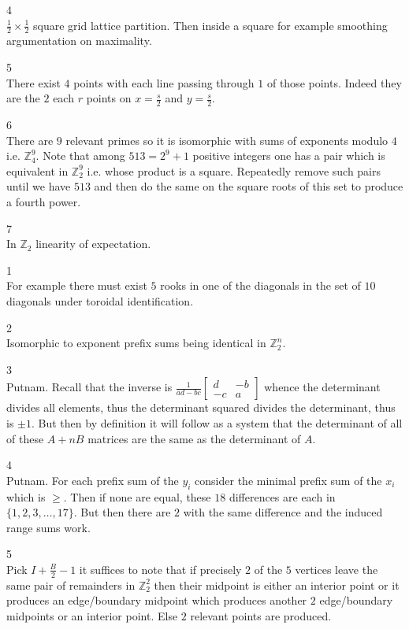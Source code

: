 4 \\
$\frac{1}{2} \times \frac{1}{2}$ square grid lattice partition. Then inside a square for example smoothing argumentation on maximality.

5 \\
There exist $4$ points with each line passing through $1$ of those points. Indeed they are the $2$ each $r$ points on $x=\frac{s}{2}$ and $y=\frac{s}{2}$.

6 \\
There are $9$ relevant primes so it is isomorphic with sums of exponents modulo $4$ i.e. $\mathbb{Z}_4^9$. Note that among $513=2^9+1$ positive integers one has a pair which is equivalent in $\mathbb{Z}_2^9$ i.e. whose product is a square. Repeatedly remove such pairs until we have $513$ and then do the same on the square roots of this set to produce a fourth power.

7 \\
In $\mathbb{Z}_2$ linearity of expectation.

1 \\
For example there must exist $5$ rooks in one of the diagonals in the set of $10$ diagonals under toroidal identification.

2 \\
Isomorphic to exponent prefix sums being identical in $\mathbb{Z}_2^n$.

3 \\
Putnam. Recall that the inverse is $\frac{1}{ad-bc}\begin{bmatrix} d & -b \\ -c & a \end{bmatrix}$ whence the determinant divides all elements, thus the determinant squared divides the determinant, thus is $\pm 1$. But then by definition it will follow as a system that the determinant of all of these $A+nB$ matrices are the same as the determinant of $A$.

4 \\
Putnam. For each prefix sum of the $y_i$ consider the minimal prefix sum of the $x_i$ which is $\ge$. Then if none are equal, these $18$ differences are each in $\{1,2,3,\dots ,17 \}$. But then there are $2$ with the same difference and the induced range sums work.

5 \\
Pick $I+\frac{B}{2}-1$ it suffices to note that if precisely $2$ of the $5$ vertices leave the same pair of remainders in $\mathbb{Z}_2^2$ then their midpoint is either an interior point or it produces an edge/boundary midpoint which produces another $2$ edge/boundary midpoints or an interior point. Else $2$ relevant points are produced.

